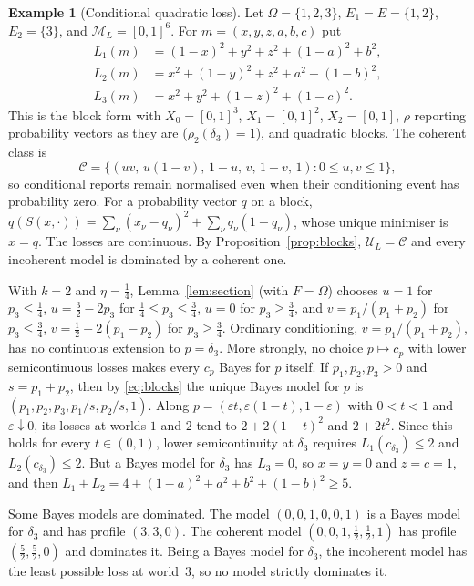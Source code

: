 \documentclass[11pt]{article}
\theoremstyle{definition}
\newtheorem{example}[theorem]{Example}
\theoremstyle{remark}
\newcommand{\M}{\mathcal M}
\newcommand{\C}{\mathcal C}
\newcommand{\U}{\mathcal U}
\begin{document}
\begin{example}[Conditional quadratic loss]\label{ex:conditional}
Let $\Omega=\{1,2,3\}$, $E_1=E=\{1,2\}$, $E_2=\{3\}$, and $\M_L=[0,1]^6$. For $m=(x,y,z,a,b,c)$ put
\[
\begin{aligned}
 L_1(m)&=(1-x)^2+y^2+z^2+(1-a)^2+b^2,\\
 L_2(m)&=x^2+(1-y)^2+z^2+a^2+(1-b)^2,\\
 L_3(m)&=x^2+y^2+(1-z)^2+(1-c)^2.
\end{aligned}
\]
This is the block form with $X_0=[0,1]^3$, $X_1=[0,1]^2$, $X_2=[0,1]$, $\rho$ reporting probability vectors as they are ($\rho_2(\delta_3)=1$), and quadratic blocks. The coherent class is
\[
 \C=\{(uv,\,u(1-v),\,1-u,\,v,\,1-v,\,1):0\le u,v\le1\},
\]
so conditional reports remain normalised even when their conditioning event has probability zero. For a probability vector $q$ on a block, $q(S(x,\cdot))=\sum_\nu(x_\nu-q_\nu)^2+\sum_\nu q_\nu(1-q_\nu)$, whose unique minimiser is $x=q$. The losses are continuous. By Proposition~\ref{prop:blocks}, $\U_L=\C$ and every incoherent model is dominated by a coherent one.

With $k=2$ and $\eta=\tfrac14$, Lemma~\ref{lem:section} (with $F=\Omega$) chooses $u=1$ for $p_3\le\tfrac14$, $u=\tfrac32-2p_3$ for $\tfrac14\le p_3\le\tfrac34$, $u=0$ for $p_3\ge\tfrac34$, and $v=p_1/(p_1+p_2)$ for $p_3\le\tfrac34$, $v=\tfrac12+2(p_1-p_2)$ for $p_3\ge\tfrac34$. Ordinary conditioning, $v=p_1/(p_1+p_2)$, has no continuous extension to $p=\delta_3$. More strongly, no choice $p\mapsto c_p$ with lower semicontinuous losses makes every $c_p$ Bayes for $p$ itself. If $p_1,p_2,p_3>0$ and $s=p_1+p_2$, then by \eqref{eq:blocks} the unique Bayes model for $p$ is $(p_1,p_2,p_3,p_1/s,p_2/s,1)$. Along $p=(\varepsilon t,\varepsilon(1-t),1-\varepsilon)$ with $0<t<1$ and $\varepsilon\downarrow0$, its losses at worlds $1$ and $2$ tend to $2+2(1-t)^2$ and $2+2t^2$. Since this holds for every $t\in(0,1)$, lower semicontinuity at $\delta_3$ requires $L_1(c_{\delta_3})\le2$ and $L_2(c_{\delta_3})\le2$. But a Bayes model for $\delta_3$ has $L_3=0$, so $x=y=0$ and $z=c=1$, and then $L_1+L_2=4+(1-a)^2+a^2+b^2+(1-b)^2\ge5$.

Some Bayes models are dominated. The model $(0,0,1,0,0,1)$ is a Bayes model for $\delta_3$ and has profile $(3,3,0)$. The coherent model $(0,0,1,\tfrac12,\tfrac12,1)$ has profile $(\tfrac52,\tfrac52,0)$ and dominates it. Being a Bayes model for $\delta_3$, the incoherent model has the least possible loss at world~$3$, so no model strictly dominates it.
\end{example}
\end{document}
